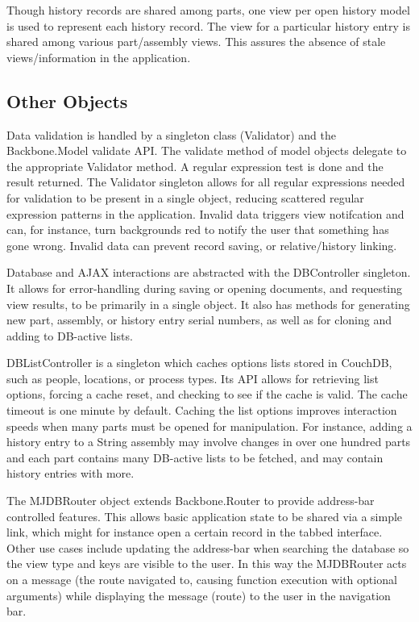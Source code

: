 \documentclass[journal]{IEEEtran}
\begin{document}
Though history records are shared among parts, one view per open history model is used to represent each history
record. The view for a particular history entry is shared among various part/assembly views. This assures the absence of
stale views/information in the application.

\subsection{Other Objects}
Data validation is handled by a singleton class (Validator) and the Backbone.Model validate API. The validate
method of model objects delegate to the appropriate Validator method.
A regular expression test is done and the result returned. The Validator singleton
allows for all regular expressions needed for validation to be present in a single object, reducing scattered
regular expression patterns in the application. Invalid data triggers view notifcation and can, for instance, turn backgrounds 
red to notify the user that something has gone wrong. Invalid data can prevent record saving, or relative/history linking.

Database and AJAX interactions are abstracted with the DBController singleton. It allows for error-handling during saving or 
opening documents, and requesting view results, to be primarily in a single object. It also has methods for generating new part, assembly, or history
entry serial numbers, as well as for cloning and adding to DB-active lists.

DBListController is a singleton which caches options lists stored in CouchDB, such as people, locations, or process types. Its
API allows for retrieving list options, forcing a cache reset, and checking to see if the cache is valid. The cache timeout is 
one minute by default. Caching the list options improves interaction speeds when many parts must be opened for manipulation. For
instance, adding a history entry to a String assembly may involve changes in over one hundred parts and each part contains many
DB-active lists to be fetched, and may contain history entries with more.

The MJDBRouter object extends Backbone.Router to provide address-bar controlled features. This allows basic application state
to be shared via a simple link, which might for instance open a certain record in the tabbed interface. Other use cases include
updating the address-bar when searching the database so the view type and keys are visible to the user. In this way the MJDBRouter
acts on a message (the route navigated to, causing function execution with optional arguments) while displaying the message (route)
to the user in the navigation bar.
\end{document}
